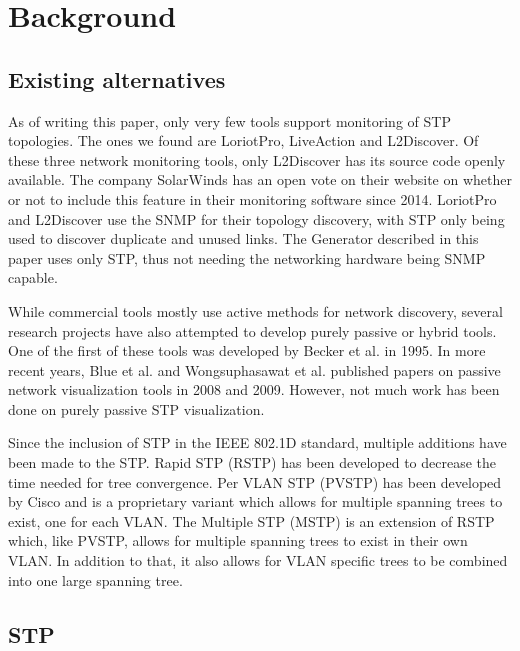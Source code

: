 \chapter{Background}
\label{background}
\section{Existing alternatives}
As of writing this paper, only very few tools support monitoring of STP topologies.
The ones we found are LoriotPro\cite{LoriotPro}, LiveAction\cite{LiveAction} and L2Discover\cite{L2Discover}.
Of these three network monitoring tools, only L2Discover has its source code openly available.
The company SolarWinds has an open vote on their website on whether or not to include this feature in their monitoring software since 2014\cite{thwackSW}.
LoriotPro and L2Discover use the SNMP for their topology discovery, with STP only being used to discover duplicate and unused links.
The Generator described in this paper uses only STP, thus not needing the networking hardware being SNMP capable.

While commercial tools mostly use active methods for network discovery, several research projects have also attempted to develop purely passive or hybrid tools.
One of the first of these tools was developed by Becker et al.\cite{becker1995} in 1995.
In more recent years, Blue et al.\cite{blue2008} and Wongsuphasawat et al.\cite{wongsuphasawat2009} published papers on passive network visualization tools in 2008 and 2009.
However, not much work has been done on purely passive STP visualization.

Since the inclusion of STP in the IEEE 802.1D\cite{802.1D} standard, multiple additions have been made to the STP.
Rapid STP (RSTP) has been developed to decrease the time needed for tree convergence.
Per VLAN STP (PVSTP) has been developed by Cisco and is a proprietary variant which allows for multiple spanning trees to exist, one for each VLAN.
The Multiple STP (MSTP) is an extension of RSTP which, like PVSTP, allows for multiple spanning trees to exist in their own VLAN.
In addition to that, it also allows for VLAN specific trees to be combined into one large spanning tree.

\section{STP}
\label{stp}

